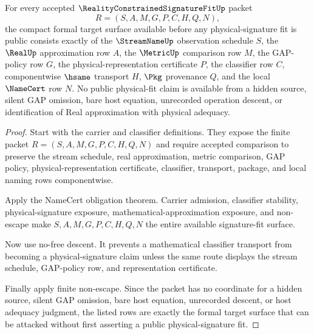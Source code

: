 \begin{theorem}
\label{thm:reality-constrained-signature-fit-formal-target-surface}
For every accepted $\RealityConstrainedSignatureFitUp$ packet
$$
R=(S,A,M,G,P,C,H,Q,N),
$$
the compact formal target surface available before any physical-signature fit
is public consists exactly of the $\StreamNameUp$ observation schedule $S$, the
$\RealUp$ approximation row $A$, the $\MetricUp$ comparison row $M$, the
GAP-policy row $G$, the physical-representation certificate $P$, the classifier
row $C$, componentwise $\hsame$ transport $H$, $\Pkg$ provenance $Q$, and the
local $\NameCert$ row $N$. No public physical-fit claim is available from a
hidden source, silent GAP omission, bare host equation, unrecorded operation
descent, or identification of Real approximation with physical adequacy.
\end{theorem}
\begin{proof}
Start with the carrier and classifier definitions. They expose the finite
packet $R=(S,A,M,G,P,C,H,Q,N)$ and require accepted comparison to preserve the
stream schedule, real approximation, metric comparison, GAP policy,
physical-representation certificate, classifier, transport, package, and local
naming rows componentwise.

Apply the NameCert obligation theorem. Carrier admission, classifier stability,
physical-signature exposure, mathematical-approximation exposure, and
non-escape make $S,A,M,G,P,C,H,Q,N$ the entire available signature-fit surface.

Now use no-free descent. It prevents a mathematical classifier transport from
becoming a physical-signature claim unless the same route displays the stream
schedule, GAP-policy row, and representation certificate.

Finally apply finite non-escape. Since the packet has no coordinate for a
hidden source, silent GAP omission, bare host equation, unrecorded descent, or
host adequacy judgment, the listed rows are exactly the formal target surface
that can be attacked without first asserting a public physical-signature fit.
\end{proof}

